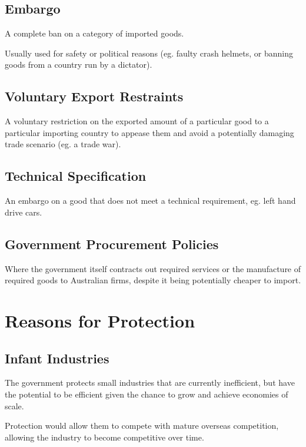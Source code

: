 \documentclass[a4paper,11pt]{report}
\begin{document}
\subsection{Embargo}

A complete ban on a category of imported goods.

Usually used for safety or political reasons (eg. faulty crash helmets, or
banning goods from a country run by a dictator).

\subsection{Voluntary Export Restraints}

A voluntary restriction on the exported amount of a particular good to a
particular importing country to appease them and avoid a potentially damaging
trade scenario (eg. a trade war).

\subsection{Technical Specification}

An embargo on a good that does not meet a technical requirement, eg. left hand
drive cars.

\subsection{Government Procurement Policies}

Where the government itself contracts out required services or the manufacture
of required goods to Australian firms, despite it being potentially cheaper to
import.


\section{Reasons for Protection}

\subsection{Infant Industries}

The government protects small industries that are currently inefficient, but
have the potential to be efficient given the chance to grow and achieve
economies of scale.

Protection would allow them to compete with mature overseas competition,
allowing the industry to become competitive over time.
\end{document}
